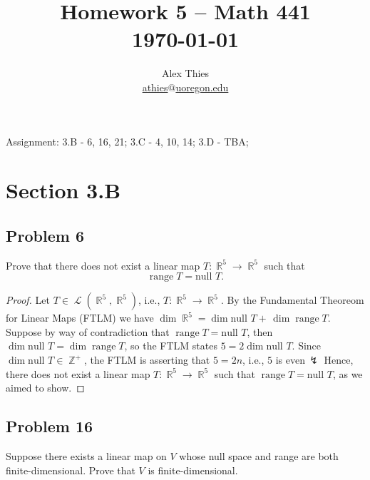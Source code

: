 \documentclass[letterpaper, 12pt]{amsart}
\DeclareMathOperator{\Z}{\mathbb{Z}}
\DeclareMathOperator{\R}{\mathbb{R}}
\renewcommand{\null}{\text{null }}
\DeclareMathOperator{\range}{\text{range }}
\DeclareMathOperator{\Ell}{\mathscr{L}}
\theoremstyle{definition}  %
\begin{document}
	\title{Homework 5  -- Math 441 \\ \today}
	\author{Alex Thies \\ \href{mailto:athies@uoregon.edu}{\lowercase{athies$@$uoregon.edu}}}

	\maketitle

	Assignment: 3.B - 6, 16, 21; 3.C - 4, 10, 14; 3.D - TBA;

	\section*{Section 3.B}
		\subsection*{Problem 6}
		Prove that there does not exist a linear map $T : \R^{5} \to \R^{5}$ such that $$\range T = \null T.$$

		\begin{proof}
		Let $T \in \Ell(\R^{5}, \R^{5})$, i.e., $T : \R^{5} \to \R^{5}$.
		By the Fundamental Theoreom for Linear Maps (FTLM) we have $\dim \R^{5} = \dim \null T + \, \dim \range T$.
		Suppose by way of contradiction that $\range T = \null T$, then $\dim \null T = \dim \range T$, so the FTLM states $5 = 2 \dim \null T$.
		Since $\dim \null T \in \Z^{+}$, the FTLM is asserting that $5 = 2n$, i.e., $5$ is even$\, \lightning$		
		Hence, there does not exist a linear map $T : \R^{5} \to \R^{5}$ such that $\range T = \null T$, as we aimed to show.
		\end{proof}

		\subsection*{Problem 16}
		Suppose there exists a linear map on $V$ whose null space and range are both finite-dimensional. 
		Prove that $V$ is finite-dimensional.
\end{document}
